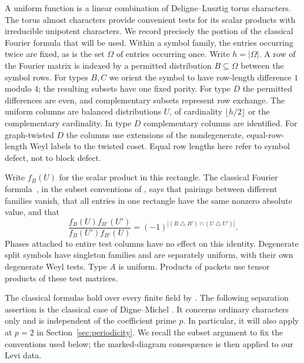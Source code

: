 A uniform function is a linear combination of Deligne--Lusztig torus
characters.  The torus almost characters provide convenient tests
for its scalar products with irreducible unipotent characters.
We record precisely the portion of the classical Fourier formula
that will be used.  Within a symbol family, the entries occurring
twice are fixed, as is the set $\Omega$ of entries occurring once.
Write $h=|\Omega|$.  A row of the Fourier matrix is indexed by a
permitted distribution $B\subseteq\Omega$ between the symbol rows.
For types $B,C$ we orient the symbol to have row-length difference
$1$ modulo $4$; the resulting subsets have one fixed parity.
For type $D$ the permitted differences are even, and complementary
subsets represent row exchange.  The uniform columns are balanced
distributions $U$, of cardinality $\lfloor h/2\rfloor$ or the
complementary cardinality.  In type $D$ complementary columns are
identified.  For graph-twisted $D$ the columns use extensions of the
nondegenerate, equal-row-length Weyl labels to the twisted coset.
Equal row lengths here refer to symbol defect, not to block defect.

Write $f_B(U)$ for the scalar product in this rectangle.  The
classical Fourier formula~\cite{LusztigCharacters}, in the
subset conventions of
\cite[Section~6.1 and Proposition~6.3]{DigneMichel1990}, says that
pairings between different families vanish, that all entries in
one rectangle have the same nonzero absolute value, and that
\begin{equation}\label{lab:fourier-ratio}
 \frac{f_B(U)f_{B'}(U')}{f_B(U')f_{B'}(U)}
   =(-1)^{|(B\mathbin\triangle B')\cap
                    (U\mathbin\triangle U')|}.
\end{equation}
Phases attached to entire test columns have no effect on this
identity.  Degenerate split symbols have singleton families and
are separately uniform, with their own degenerate Weyl tests.
Type $A$ is uniform.  Products of packets use tensor products of
these test matrices.

The classical formulas hold over every finite field by
\cite[Corollary~4.3]{AsaiSmall}.  The following separation assertion
is the classical case of Digne--Michel
\cite[Proposition~6.3]{DigneMichel1990}.
It concerns ordinary characters only and is independent of the
coefficient prime $p$.  In particular, it will also apply at $p=2$
in Section~\ref{sec:periodicity}.
We recall the subset argument to fix the conventions used below;
the marked-diagram consequence is then applied to our Levi data.

